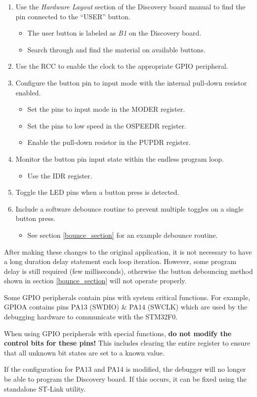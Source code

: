 \documentclass[openany,11pt,fleqn]{book} %
\begin{document}
\begin{enumerate}
    \item Use the \textit{Hardware Layout} section of the Discovery board manual to find the pin connected to the ``USER'' button.
    \begin{itemize}
        \item The user button is labeled as \textit{B1} on the Discovery board.
        \item Search through and find the material on available buttons. 
    \end{itemize}
    \item Use the RCC to enable the clock to the appropriate GPIO peripheral.
    \item Configure the button pin to input mode with the internal pull-down resistor enabled.
    \begin{itemize}
        \item Set the pins to input mode in the MODER register. 
        \item Set the pins to low speed in the OSPEEDR register. 
        \item Enable the pull-down resistor in the PUPDR register. 
    \end{itemize}
    \item Monitor the button pin input state within the endless program loop.
    \begin{itemize}
        \item Use the IDR register.  
    \end{itemize}
    \item Toggle the LED pins when a button press is detected.
    \item Include a software debounce routine to prevent multiple toggles on a single button press.
    \begin{itemize}
        \item See section \ref{bounce_section} for an example debounce routine. 
    \end{itemize}
\end{enumerate}

After making these changes to the original application, it is not necessary to have a long duration delay statement each loop iteration. However, some program delay is still required (few milliseconds), otherwise the button debouncing method shown in section \ref{bounce_section} will not operate properly. 

\begin{warning}
    Some GPIO peripherals contain pins with system critical functions. For example, GPIOA contains pins PA13 (SWDIO) \& PA14 (SWCLK) which are used by the debugging hardware to communicate with the STM32F0. 
    
    When using GPIO peripherals with special functions, \textbf{do not modify the control bits for these pins!} This includes clearing the entire register to ensure that all unknown bit states are set to a known value. 
    
    If the configuration for PA13 and PA14 is modified, the debugger will no longer be able to program the Discovery board. If this occurs, it can be fixed using the standalone ST-Link utility.
\end{warning}
\end{document}
